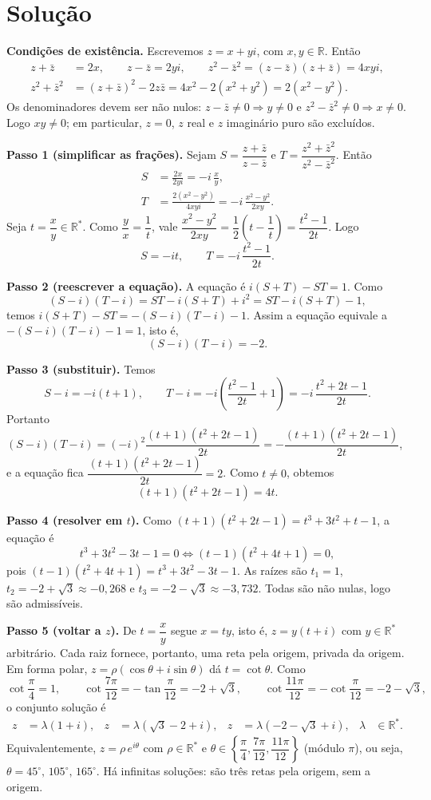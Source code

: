 \documentclass{article}%
\begin{document}
\section*{Solução}

\textbf{Condições de existência.} Escrevemos $z=x+yi$, com $x,y\in\mathbb{R}$. Então
\begin{align*}
z+\bar z&=2x, \qquad z-\bar z=2yi, \qquad z^2-\bar z^2=(z-\bar z)(z+\bar z)=4xyi,\\
z^2+\bar z^2&=(z+\bar z)^2-2z\bar z=4x^2-2(x^2+y^2)=2(x^2-y^2).
\end{align*}
Os denominadores devem ser não nulos: $z-\bar z\neq 0\Rightarrow y\neq 0$ e $z^2-\bar z^2\neq 0\Rightarrow x\neq 0$. Logo $xy\neq 0$; em particular, $z=0$, $z$ real e $z$ imaginário puro são excluídos.

\textbf{Passo 1 (simplificar as frações).} Sejam $S=\dfrac{z+\bar z}{z-\bar z}$ e $T=\dfrac{z^2+\bar z^2}{z^2-\bar z^2}$. Então
\begin{align*}
S&=\frac{2x}{2yi}=-i\,\frac{x}{y},\\
T&=\frac{2(x^2-y^2)}{4xyi}=-i\,\frac{x^2-y^2}{2xy}.
\end{align*}
Seja $t=\dfrac{x}{y}\in\mathbb{R}^*$. Como $\dfrac{y}{x}=\dfrac1t$, vale $\dfrac{x^2-y^2}{2xy}=\dfrac12\left(t-\dfrac1t\right)=\dfrac{t^2-1}{2t}$. Logo
\[
S=-it,\qquad T=-i\,\frac{t^2-1}{2t}.
\]

\textbf{Passo 2 (reescrever a equação).} A equação é $i(S+T)-ST=1$. Como
\[
(S-i)(T-i)=ST-i(S+T)+i^2=ST-i(S+T)-1,
\]
temos $i(S+T)-ST=-(S-i)(T-i)-1$. Assim a equação equivale a $-(S-i)(T-i)-1=1$, isto é,
\[
(S-i)(T-i)=-2.
\]

\textbf{Passo 3 (substituir).} Temos
\[
S-i=-i(t+1),\qquad T-i=-i\left(\frac{t^2-1}{2t}+1\right)=-i\,\frac{t^2+2t-1}{2t}.
\]
Portanto $(S-i)(T-i)=(-i)^2\dfrac{(t+1)(t^2+2t-1)}{2t}=-\dfrac{(t+1)(t^2+2t-1)}{2t}$, e a equação fica $\dfrac{(t+1)(t^2+2t-1)}{2t}=2$. Como $t\neq 0$, obtemos
\[
(t+1)(t^2+2t-1)=4t.
\]

\textbf{Passo 4 (resolver em $t$).} Como $(t+1)(t^2+2t-1)=t^3+3t^2+t-1$, a equação é
\[
t^3+3t^2-3t-1=0 \iff (t-1)(t^2+4t+1)=0,
\]
pois $(t-1)(t^2+4t+1)=t^3+3t^2-3t-1$. As raízes são $t_1=1$, $t_2=-2+\sqrt{3}\approx -0{,}268$ e $t_3=-2-\sqrt{3}\approx -3{,}732$. Todas são não nulas, logo são admissíveis.

\textbf{Passo 5 (voltar a $z$).} De $t=\dfrac{x}{y}$ segue $x=ty$, isto é, $z=y(t+i)$ com $y\in\mathbb{R}^*$ arbitrário. Cada raiz fornece, portanto, uma reta pela origem, privada da origem. Em forma polar, $z=\rho(\cos\theta+i\sin\theta)$ dá $t=\cot\theta$. Como
\[
\cot\frac{\pi}{4}=1,\qquad \cot\frac{7\pi}{12}=-\tan\frac{\pi}{12}=-2+\sqrt{3},\qquad \cot\frac{11\pi}{12}=-\cot\frac{\pi}{12}=-2-\sqrt{3},
\]
o conjunto solução é
\begin{align*}
z&=\lambda(1+i), & z&=\lambda(\sqrt{3}-2+i), & z&=\lambda(-2-\sqrt{3}+i), & \lambda&\in\mathbb{R}^*.
\end{align*}
Equivalentemente, $z=\rho\,e^{i\theta}$ com $\rho\in\mathbb{R}^*$ e $\theta\in\left\{\dfrac{\pi}{4},\dfrac{7\pi}{12},\dfrac{11\pi}{12}\right\}$ (módulo $\pi$), ou seja, $\theta=45^\circ,\,105^\circ,\,165^\circ$. Há infinitas soluções: são três retas pela origem, sem a origem.
\end{document}
